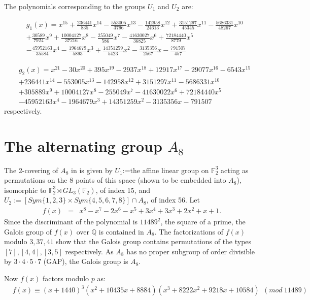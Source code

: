 \documentclass[reqno,12pt]{amsart}
\theoremstyle{remark}
\theoremstyle{definition}
\theoremstyle{citing}
\numberwithin{theorem}{section}
\numberwithin{equation}{section}
\begin{document}
The polynomials corresponding to the groups $U_{1}$ and $U_{2}$
are:

\begin{eqnarray*}
 & g_{1}(x)=x^{15}+\frac{236441}{835}x^{14}-\frac{553005}{3796}x^{13}-\frac{142958}{24613}x^{12}+\frac{3151297}{45345}x^{11}-\frac{5686331}{48267}x^{10}\\
 & +\frac{30589}{7924}x^{9}+\frac{10004127}{37216}x^{8}-\frac{255049}{586}x^{7}-\frac{41630027}{36825}x^{6}+\frac{72184440}{8779}x^{5}\\
 & -\frac{45952163}{35584}x^{4}-\frac{1964679}{5893}x^{3}+\frac{14351259}{5423}x^{2}-\frac{3135356}{2567}x-\frac{791507}{457}\end{eqnarray*}

\begin{eqnarray*}
 & g_{2}(x)=x^{21}-30x^{20}+395x^{19}-2937x^{18}+12917x^{17}-29077x^{16}-6543x^{15}\\
 & +236441x^{14}-553005x^{13}-142958x^{12}+3151297x^{11}-5686331x^{10}\\
 & +305889x^{9}+10004127x^{8}-255049x^{7}-41630022x^{6}+72184440x^{5}\\
 & -45952163x^{4}-1964679x^{3}+14351259x^{2}-3135356x-791507\end{eqnarray*}
respectively.

\section{The alternating group $A_{8}$}

The 2-covering of $A_8$ in \cite{Bubboloni} is given by $U_1$:=the affine linear group on ${{\mathbb{{F}}}}_2^3$ acting as permutations on the 8 points of this space (shown to be embedded into $A_8$), isomorphic to ${{\mathbb{{F}}}}_2^3\rtimes GL_3({{\mathbb{{F}}}}_2)$, of index 15, and $U_2:=[Sym\{1,2,3\}\times Sym\{4,5,6,7,8\}]\cap A_{8}$, of index 56.
Let \begin{eqnarray*}
f(x) & = & x^{8}-x^{7}-2x^{6}-x^{5}+3x^{4}+3x^{3}+2x^{2}+x+1.\end{eqnarray*}
Since the discriminant
of the polynomial is $11489^{2}$, the square of a prime,  the Galois group of $f(x)$ over $\mathbb{Q}$ is contained
in $A_{8}$.  The factorizations of $f(x)$ modulo $3,37,41$ show that the Galois group contains permutations of the types $[7],[4,4],[3,5]$ respectively.  As $A_8$ has no proper subgroup of order divisible by $3\cdot 4 \cdot 5 \cdot 7$ (GAP), the Galois group is $A_8$.

Now
$f(x)$ factors modulo $p$ as: \begin{eqnarray*}
 & f(x)\equiv(x+1440)^{3}(x^{2}+10435x+8884)(x^{3}+8222x^{2}+9218x+10584)\ \ (mod\ 11489)\end{eqnarray*}
\end{document}
